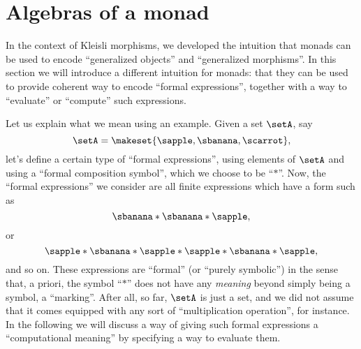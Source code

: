 
\section{Algebras of a monad}
\label{sec:Eilenberg-Moore}



In the context of Kleisli morphisms, we developed the intuition that monads can be used to encode ``generalized objects'' and ``generalized morphisms''.
In this section we will introduce a different intuition for monads: that they can be used to provide coherent way to encode ``formal expressions'', together with a way to ``evaluate'' or ``compute'' such expressions.

Let us explain what we mean using an example.
Given a set $\setA$, say
\begin{equation}
    \setA = \makeset{ \sapple, \sbanana, \scarrot },
\end{equation}
let's define a certain type of ``formal expressions'', using elements of $\setA$ and using a ``formal composition symbol'', which we choose to be ``$*$''.
Now, the ``formal expressions'' we consider are all finite expressions which have a form such as
\begin{equation}
    \label{eq:formal-composition-1}
    \sbanana * \sbanana * \sapple,
\end{equation}
or
\begin{equation}
    \label{eq:formal-composition-2}
    \sapple * \sbanana * \sapple * \sapple * \sbanana * \sapple,
\end{equation}
and so on.
These expressions are ``formal'' (or ``purely symbolic'') in the sense that, a priori, the symbol ``$*$'' does not have any \emph{meaning} beyond simply being a symbol, a ``marking''.
After all, so far, $\setA$ is just a set, and we did not assume that it comes equipped with any sort of ``multiplication operation'', for instance.
In the following we will discuss a way of giving such formal expressions a ``computational meaning'' by specifying a way to evaluate them.

